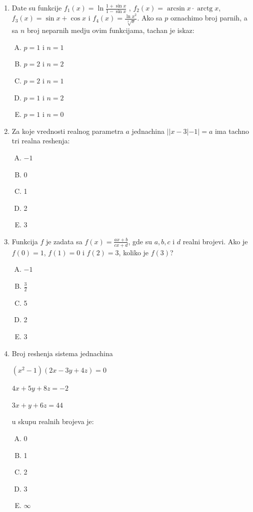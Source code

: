 \documentclass[a4paper,12pt]{article}
\newcommand{\Lat}{\fontencoding{OT1}\selectfont}
\renewcommand{\arctg}{\operatorname{arctg}}
\begin{document}
\begin{enumerate}[1.]
\item Date su funkcije  $ f_1(x) = \ln \frac{1 + \sin{x}}{1 - \sin{x}}$ , $ f_2(x) = \arcsin{x} \cdot \arctg{x} $, $ f_3(x) = \sin{x} + \cos{x} $ i $f_4(x) = \frac{\ln{x^2}}{\sqrt[3]{x}} $. Ako sa $p$ oznachimo broj parnih, a sa $n$ broj neparnih medju ovim funkcijama, tachan je iskaz:
{\Lat
\begin{multicols}{3}
\begin{enumerate}[A)]
\item $p = 1$ i $n = 1$ \item $p = 2$ i $n = 2$ \item $p = 2$ i $n = 1$ \item $p = 1$ i $n = 2$ \item $p = 1$ i $n = 0$
\end{enumerate}
\end{multicols}
}



\item Za koje vrednosti realnog parametra $a$ jednachina $||x-3|-1|=a$ ima tachno tri realna reshenja:
{\Lat
\begin{multicols}{5}
\begin{enumerate}[A)]
\item $-1$ \item 0 \item 1 \item 2 \item 3
\end{enumerate}
\end{multicols}
}


\item Funkcija $f$ je zadata sa $f(x) = \frac{ax +b}{cx+d} $, gde su $a,b,c$ i $d$ realni brojevi. Ako je $f(0) = 1$,  $f(1) = 0$ i  $f(2) = 3$, koliko je  $f(3)$?
{\Lat
\begin{multicols}{5}
\begin{enumerate}[A)]
\item $-1$ \item $\frac{3}{2}$ \item 5 \item 2 \item 3
\end{enumerate}
\end{multicols}
}


\item Broj reshenja sistema jednachina 
\par $(x^{2} - 1)(2x -3y + 4z) = 0$
\par $4x + 5y +8z = -2$
\par $3x + y + 6z = 44$
\par u skupu realnih brojeva je: 
{\Lat
\begin{multicols}{5}
\begin{enumerate}[A)]
\item 0 \item 1 \item 2 \item 3 \item $\infty$
\end{enumerate}
\end{multicols}
}


\end{enumerate}
\end{document}
